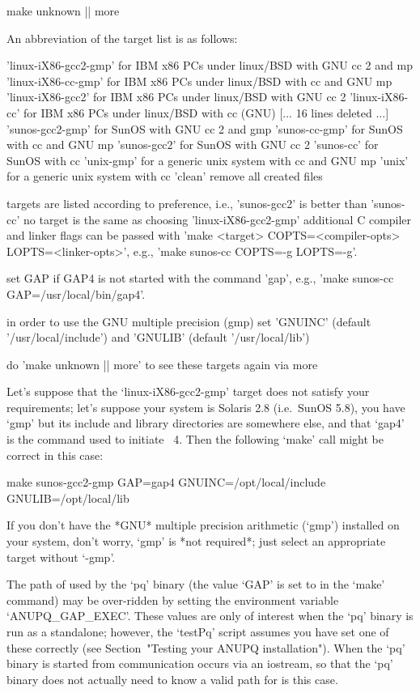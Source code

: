 \begintt
make unknown || more
\endtt

An abbreviation of the target list is as follows:

\begintt
'linux-iX86-gcc2-gmp'      for IBM x86 PCs under linux/BSD with GNU cc 2 and mp
'linux-iX86-cc-gmp'        for IBM x86 PCs under linux/BSD with cc and GNU mp
'linux-iX86-gcc2'          for IBM x86 PCs under linux/BSD with GNU cc 2
'linux-iX86-cc'            for IBM x86 PCs under linux/BSD with cc (GNU)
[... 16 lines deleted ...]
'sunos-gcc2-gmp'           for SunOS with GNU cc 2 and gmp
'sunos-cc-gmp'             for SunOS with cc and GNU mp
'sunos-gcc2'               for SunOS with GNU cc 2
'sunos-cc'                 for SunOS with cc
'unix-gmp'                 for a generic unix system with cc and GNU mp
'unix'                     for a generic unix system with cc
'clean'                    remove all created files

   targets are listed according to preference,
   i.e., 'sunos-gcc2' is better than 'sunos-cc'
   no target is the same as choosing 'linux-iX86-gcc2-gmp'
   additional C compiler and linker flags can be passed with
   'make <target> COPTS=<compiler-opts> LOPTS=<linker-opts>',
   e.g., 'make sunos-cc COPTS=-g LOPTS=-g'.

   set GAP if GAP4 is not started with the command 'gap',
   e.g., 'make sunos-cc GAP=/usr/local/bin/gap4'.

   in order to use the GNU multiple precision (gmp) set
   'GNUINC' (default '/usr/local/include') and 
   'GNULIB' (default '/usr/local/lib')

   do 'make unknown || more' to see these targets again via more
\endtt

Let's suppose that the `linux-iX86-gcc2-gmp' target does not satisfy your
requirements; let's suppose your system is Solaris 2.8 (i.e.~SunOS  5.8),
you have `gmp' but its include  and  library  directories  are  somewhere
else, and that `gap4' is the command used to initiate {\GAP}~4. Then  the
following `make' call might be correct in this case:

\begintt
make sunos-gcc2-gmp GAP=gap4 GNUINC=/opt/local/include GNULIB=/opt/local/lib
\endtt

If you  don't  have  the  *GNU*  multiple  precision  arithmetic  (`gmp')
installed on your system, don't worry,  `gmp'  is  *not  required*;  just
select an appropriate target without `-gmp'.

The path of {\GAP} used by the `pq' binary (the value `GAP' is set to  in
the `make'  command)  may  be  over-ridden  by  setting  the  environment
variable `ANUPQ_GAP_EXEC'. These values are only  of  interest  when  the
`pq' binary is run as a standalone; however, the `testPq' script  assumes
you have set one of these  correctly  (see  Section~"Testing  your  ANUPQ
installation"). When the `pq' binary is started from {\GAP} communication
occurs via an iostream, so that the `pq' binary does not actually need to
know a valid path for {\GAP} is this case.

